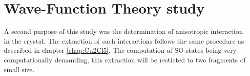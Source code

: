 \documentclass[10pt]{report}
\numberwithin{equation}{section}
\begin{document}



\section{Wave-Function Theory study}

A second purpose of this study was the determination of anisotropic interaction in the crystal.
The extraction of such interactions follows the same procedure as described in chapter \autoref{chap:Cu2Cl5}.
The computation of SO-states being very computationally demanding, this extraction will be resticted to two fragments of small size.
\end{document}
